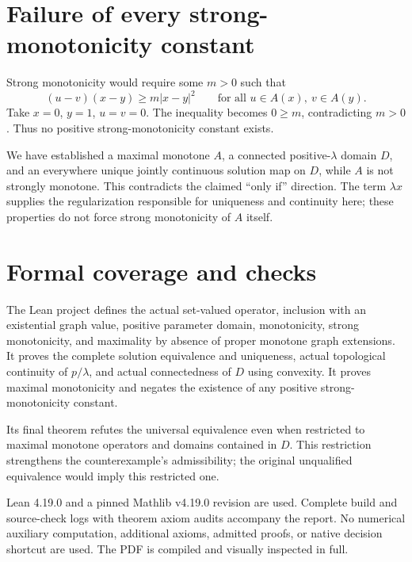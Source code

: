 \documentclass[11pt,a4paper]{article}
\begin{document}
\section*{Failure of every strong-monotonicity constant}
Strong monotonicity would require some $m>0$ such that
\[
 (u-v)(x-y)\geq m|x-y|^2
 \qquad\text{for all }u\in A(x),\ v\in A(y).
\]
Take $x=0$, $y=1$, $u=v=0$. The inequality becomes $0\geq m$, contradicting $m>0$. Thus no positive strong-monotonicity constant exists.

We have established a maximal monotone $A$, a connected positive-$\lambda$ domain $D$, and an everywhere unique jointly continuous solution map on $D$, while $A$ is not strongly monotone. This contradicts the claimed ``only if'' direction. The term $\lambda x$ supplies the regularization responsible for uniqueness and continuity here; these properties do not force strong monotonicity of $A$ itself.

\section*{Formal coverage and checks}
The Lean project defines the actual set-valued operator, inclusion with an existential graph value, positive parameter domain, monotonicity, strong monotonicity, and maximality by absence of proper monotone graph extensions. It proves the complete solution equivalence and uniqueness, actual topological continuity of $p/\lambda$, and actual connectedness of $D$ using convexity. It proves maximal monotonicity and negates the existence of any positive strong-monotonicity constant.

Its final theorem refutes the universal equivalence even when restricted to maximal monotone operators and domains contained in $D$. This restriction strengthens the counterexample's admissibility; the original unqualified equivalence would imply this restricted one.

Lean 4.19.0 and a pinned Mathlib v4.19.0 revision are used. Complete build and source-check logs with theorem axiom audits accompany the report. No numerical auxiliary computation, additional axioms, admitted proofs, or native decision shortcut are used. The PDF is compiled and visually inspected in full.
\end{document}
